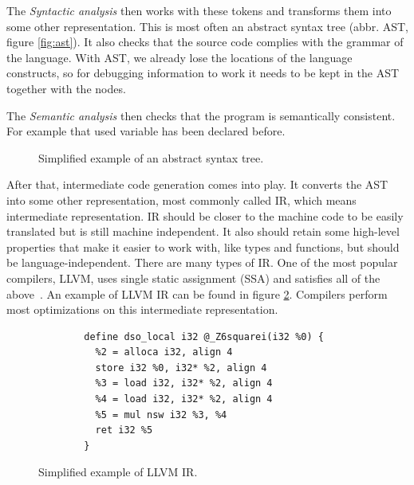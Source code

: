 The \textit{Syntactic analysis} then works with these tokens and transforms
them into some other representation. This is most often an abstract syntax tree
(abbr. AST, figure \ref{fig:ast}). It also checks that the source code complies
with the grammar of the language. With AST, we already lose the locations
of the language constructs, so for debugging information to work it needs
to be kept in the AST together with the nodes.

The \textit{Semantic analysis} then checks that the program is semantically
consistent. For example that used variable has been declared before.

\begin{figure}\label{fig:ast}
    \centering
    \caption{Simplified example of an abstract syntax tree.}
    \label{fig:astgraph}
\end{figure}
 
After that, intermediate code generation comes into play. It converts the AST
into some other representation, most commonly called IR, which means
intermediate representation. IR should be closer to the machine code to be
easily translated but is still machine independent. It also should retain some
high-level properties that make it easier to work with, like types and
functions, but should be language-independent. There are many types of IR. One
of the most popular compilers, LLVM, uses single static assignment (SSA) and
satisfies all of the above~\cite{llvm}. An example of LLVM IR can be found in
figure \ref{fig:llvm-ir-example}. Compilers perform most optimizations on this
intermediate representation. 

\begin{figure}
    \begin{verbatim}
        define dso_local i32 @_Z6squarei(i32 %0) {
          %2 = alloca i32, align 4
          store i32 %0, i32* %2, align 4
          %3 = load i32, i32* %2, align 4
          %4 = load i32, i32* %2, align 4
          %5 = mul nsw i32 %3, %4
          ret i32 %5
        }
    \end{verbatim}
    \caption{Simplified example of LLVM IR.}
    \label{fig:llvm-ir-example}
\end{figure}

